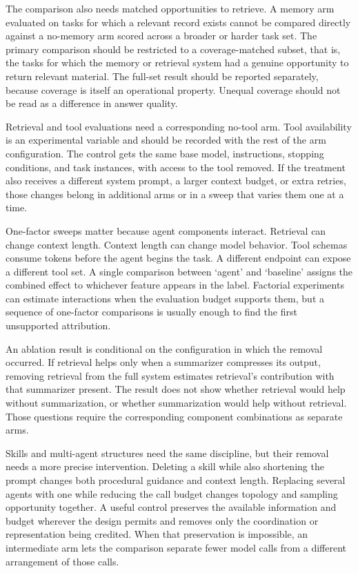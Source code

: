 The comparison also needs matched opportunities to retrieve. A memory arm evaluated on tasks for which a relevant record exists cannot be compared directly against a no-memory arm scored across a broader or harder task set. The primary comparison should be restricted to a coverage-matched subset, that is, the tasks for which the memory or retrieval system had a genuine opportunity to return relevant material. The full-set result should be reported separately, because coverage is itself an operational property. Unequal coverage should not be read as a difference in answer quality.

Retrieval and tool evaluations need a corresponding no-tool arm. Tool availability is an experimental variable and should be recorded with the rest of the arm configuration. The control gets the same base model, instructions, stopping conditions, and task instances, with access to the tool removed. If the treatment also receives a different system prompt, a larger context budget, or extra retries, those changes belong in additional arms or in a sweep that varies them one at a time.

One-factor sweeps matter because agent components interact. Retrieval can change context length. Context length can change model behavior. Tool schemas consume tokens before the agent begins the task. A different endpoint can expose a different tool set. A single comparison between `agent' and `baseline' assigns the combined effect to whichever feature appears in the label. Factorial experiments can estimate interactions when the evaluation budget supports them, but a sequence of one-factor comparisons is usually enough to find the first unsupported attribution.

An ablation result is conditional on the configuration in which the removal occurred. If retrieval helps only when a summarizer compresses its output, removing retrieval from the full system estimates retrieval's contribution with that summarizer present. The result does not show whether retrieval would help without summarization, or whether summarization would help without retrieval. Those questions require the corresponding component combinations as separate arms.

Skills and multi-agent structures need the same discipline, but their removal needs a more precise intervention. Deleting a skill while also shortening the prompt changes both procedural guidance and context length. Replacing several agents with one while reducing the call budget changes topology and sampling opportunity together. A useful control preserves the available information and budget wherever the design permits and removes only the coordination or representation being credited. When that preservation is impossible, an intermediate arm lets the comparison separate fewer model calls from a different arrangement of those calls.

